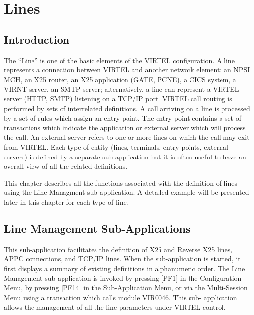 \documentclass[letterpaper,10pt,english]{sphinxmanual}
\begin{document}

\chapter{Lines}
\label{\detokenize{connectivity_guide:index-4}}\label{\detokenize{connectivity_guide:lines}}

\section{Introduction}
\label{\detokenize{connectivity_guide:introduction}}
The “Line” is one of the basic elements of the VIRTEL configuration. A line represents a connection between VIRTEL and another network element: an NPSI MCH, an X25 router, an X25 application (GATE, PCNE), a CICS system, a VIRNT server, an SMTP server; alternatively, a line can represent a VIRTEL server (HTTP, SMTP) listening on a TCP/IP port. VIRTEL call routing is performed by sets of interrelated definitions. A call arriving on a line is processed by a set of rules which assign an entry point. The entry point contains a set of transactions which indicate the application or external server which will process the call. An external server refers to one or more lines on which the call may exit from VIRTEL. Each type of entity (lines, terminals, entry points, external servers) is defined by a separate sub-application but it is often useful to have an overall view of all the related definitions.

This chapter describes all the functions associated with the definition of lines using the Line Managment sub-application. A detailed example will be presented later in
this chapter for each type of line.


\section{Line Management Sub-Applications}
\label{\detokenize{connectivity_guide:index-5}}\label{\detokenize{connectivity_guide:line-management-sub-applications}}
This sub-application facilitates the definition of X25 and Reverse X25 lines, APPC connections, and TCP/IP lines. When the sub-application is started, it first displays a summary of existing definitions in alphanumeric order. The Line Management sub-application is invoked by pressing {[}PF1{]} in the Configuration Menu, by pressing {[}PF14{]} in the Sub-Application Menu, or via the Multi-Session Menu using a transaction which calls module VIR0046. This sub- application allows the management of all the line parameters under VIRTEL control.
\end{document}
